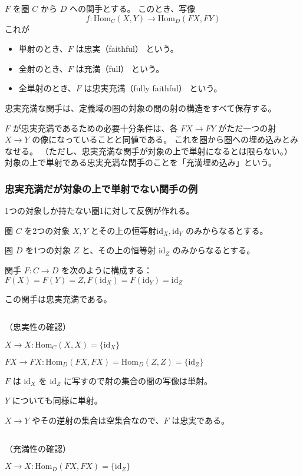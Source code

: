 \documentclass[uplatex,a4j,12pt,dvipdfmx]{jsarticle}
\begin{document}
$F$ を圏 $C$ から $D$ への関手とする。
このとき、写像
$$
	f : \text{Hom}_{C}(X,Y) \to \text{Hom}_{D}(FX,FY)
$$
これが
\begin{itemize}
	\item 単射のとき、$F$ は忠実（faithful） という。
	\item 全射のとき、$F$ は充満（full） という。
	\item 全単射のとき、$F$ は忠実充満（fully faithful） という。
\end{itemize}

忠実充満な関手は、定義域の圏の対象の間の射の構造をすべて保存する。

$F$ が忠実充満であるための必要十分条件は、各 $FX \to FY$ がただ一つの射 $X \to Y$ の像になっていることと同値である。
これを圏から圏への埋め込みとみなせる。
（ただし、忠実充満な関手が対象の上で単射になるとは限らない。）
対象の上で単射である忠実充満な関手のことを「充満埋め込み」という。


\subsubsection{忠実充満だが対象の上で単射でない関手の例}

1つの対象しか持たない圏1に対して反例が作れる。

圏 $C$ を2つの対象 $X,Y$ とその上の恒等射$\text{id}_{X}, \text{id}_{Y}$ のみからなるとする。

圏 $D$ を1つの対象 $Z$ と、その上の恒等射 $\text{id}_{Z}$ のみからなるとする。

関手 $F:C \to D$ を次のように構成する：
$F(X)=F(Y)=Z, F(\text{id}_{X})=F(\text{id}_{Y})=\text{id}_{Z}$

この関手は忠実充満である。

${}$

（忠実性の確認）

$X \to X: \text{Hom}_{C}(X,X) = \{ \text{id}_{X} \}$

$FX \to FX: \text{Hom}_{D}(FX,FX) = \text{Hom}_{D}(Z,Z) = \{ \text{id}_{Z} \}$

$F$ は $\text{id}_{X}$ を $\text{id}_{Z}$ に写すので射の集合の間の写像は単射。

$Y$ についても同様に単射。

$X \to Y$ やその逆射の集合は空集合なので、$F$ は忠実である。

${}$

（充満性の確認）

$X \to X: \text{Hom}_{D}(FX,FX) = \{ \text{id}_{Z} \}$
\end{document}
